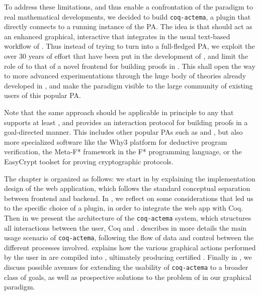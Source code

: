 To address these limitations, and thus enable a confrontation of the
 paradigm to real mathematical developments, we decided to build
\texttt{coq-actema}, a  plugin that directly connects  to a running
instance of the  PA. The idea is that  should act as an enhanced
graphical, interactive  that integrates in the usual text-based
workflow of . Thus instead of trying to turn  into a
full-fledged PA, we exploit the over 30 years of effort that have been put in
the development of , and limit the role of  to that of a novel frontend
for building proofs in . This shall open the way to more advanced
experimentations through the huge body of theories already developed in , and
make the  paradigm visible to the large community of existing
users of this popular PA.

Note that the same approach should be applicable in principle to any  that
supports at least , and provides an interaction protocol for building proofs
in a goal-directed manner. This includes other popular PAs such as  and
, but also more specialized software like the Why3 platform for
deductive program verification, the Meta-F* framework in the F* programming
language, or the EasyCrypt toolset for proving cryptographic protocols.


The chapter is organized as follows: we start in  by explaining
the implementation design of the  web application, which follows the
standard conceptual separation between frontend and backend. In
, we reflect on some considerations that led us to the
specific choice of a  plugin, in order to integrate the  web app with
Coq. Then in  we present the architecture of the
\texttt{coq-actema} system, which structures all interactions between the user,
Coq and .  describes in more details the main usage
scenario of \texttt{coq-actema}, following the flow of data and control between
the different processes involved.  explains how the various
graphical actions performed by the user in  are compiled into  ,
ultimately producing certified . Finally in , we
discuss possible avenues for extending the usability of \texttt{coq-actema} to a
broader class of  goals, as well as prospective solutions to the problem of
 in our graphical paradigm.

